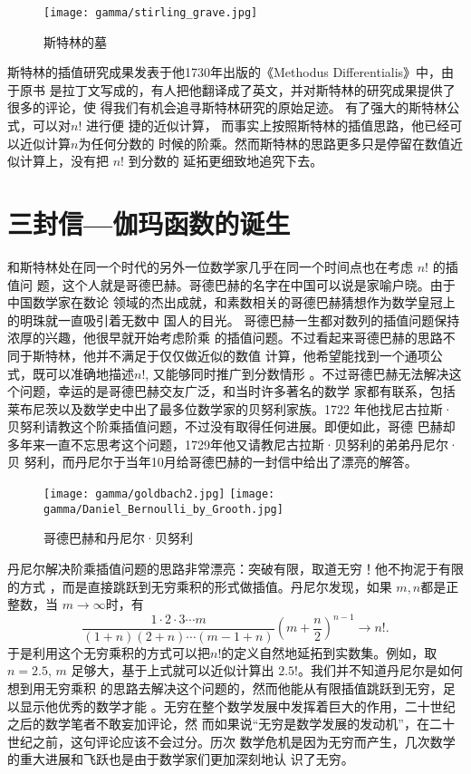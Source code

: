 \begin{figure}[htbp]
\centering
\texttt{[image: gamma/stirling\_grave.jpg]}
\caption{斯特林的墓}
\end{figure}

斯特林的插值研究成果发表于他1730年出版的《Methodus Differentialis》中，由于原书
是拉丁文写成的，有人把他翻译成了英文，并对斯特林的研究成果提供了很多的评论，使
得我们有机会追寻斯特林研究的原始足迹。 有了强大的斯特林公式，可以对$n!$ 进行便
捷的近似计算， 而事实上按照斯特林的插值思路，他已经可以近似计算$n$为任何分数的
时候的阶乘。然而斯特林的思路更多只是停留在数值近似计算上，没有把 $n!$ 到分数的
延拓更细致地追究下去。


\section{三封信---伽玛函数的诞生}

和斯特林处在同一个时代的另外一位数学家几乎在同一个时间点也在考虑 $n!$ 的插值问
题，这个人就是哥德巴赫。哥德巴赫的名字在中国可以说是家喻户晓。由于中国数学家在数论
领域的杰出成就，和素数相关的哥德巴赫猜想作为数学皇冠上的明珠就一直吸引着无数中
国人的目光。 哥德巴赫一生都对数列的插值问题保持浓厚的兴趣，他很早就开始考虑阶乘
的插值问题。不过看起来哥德巴赫的思路不同于斯特林，他并不满足于仅仅做近似的数值
计算，他希望能找到一个通项公式，既可以准确地描述$n!$, 又能够同时推广到分数情形
。不过哥德巴赫无法解决这个问题，幸运的是哥德巴赫交友广泛，和当时许多著名的数学
家都有联系，包括莱布尼茨以及数学史中出了最多位数学家的贝努利家族。1722
年他找尼古拉斯·贝努利请教这个阶乘插值问题，不过没有取得任何进展。即便如此，哥德
巴赫却多年来一直不忘思考这个问题，1729年他又请教尼古拉斯·贝努利的弟弟丹尼尔·贝
努利，而丹尼尔于当年10月给哥德巴赫的一封信中给出了漂亮的解答。

\begin{figure}[htbp]
\centering
\texttt{[image: gamma/goldbach2.jpg]}
\quad\quad
\texttt{[image: gamma/Daniel\_Bernoulli\_by\_Grooth.jpg]}
\caption{哥德巴赫和丹尼尔·贝努利}
\end{figure}


丹尼尔解决阶乘插值问题的思路非常漂亮：突破有限，取道无穷！他不拘泥于有限的方式
，而是直接跳跃到无穷乘积的形式做插值。丹尼尔发现，如果 $m,n$都是正整数，当 $m
\rightarrow \infty$时，有
$$ \frac{1\cdot 2\cdot 3 \cdots m}{(1+n)(2+n)\cdots (m-1+n)}(m+\frac{n}{2})^{n-1} 
\rightarrow n! .$$
于是利用这个无穷乘积的方式可以把$n!$的定义自然地延拓到实数集。例如，取 $n=2.5$, $m$
足够大，基于上式就可以近似计算出 $2.5!$。我们并不知道丹尼尔是如何想到用无穷乘积
的思路去解决这个问题的，然而他能从有限插值跳跃到无穷，足以显示他优秀的数学才能
。无穷在整个数学发展中发挥着巨大的作用，二十世纪之后的数学笔者不敢妄加评论，然
而如果说“无穷是数学发展的发动机”，在二十世纪之前，这句评论应该不会过分。历次
数学危机是因为无穷而产生，几次数学的重大进展和飞跃也是由于数学家们更加深刻地认
识了无穷。 

